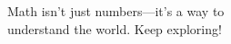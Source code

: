 \documentclass[preview]{standalone}
\begin{document}
\begin{center}
Math isn't just numbers—it's a way to \\ understand the world. Keep exploring!
\end{center}
\end{document}
